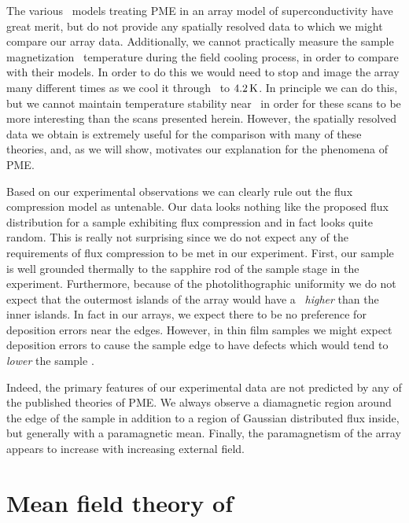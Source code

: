 The various \jjnoun\ models treating PME in an array model of 
superconductivity
have great merit, but do not provide any spatially resolved data
to which we might compare our array data. Additionally, we 
cannot practically measure the sample magnetization \vs\
temperature during the field cooling process, in order to 
compare with their models. In order to do this we would
need to stop and image the array many different times as we cool
it through \tc\ to $4.2\,\kelvin$. In principle we can do this, 
but we cannot maintain temperature stability near \tc\ in order 
for these scans to be more interesting than the scans presented
herein. However, the spatially resolved data we obtain is 
extremely useful for the comparison with many of these theories, 
and, as we will show, motivates our explanation for the 
phenomena of PME.

Based on our experimental observations we can clearly rule out
the flux compression model as untenable. Our data looks nothing
like the proposed flux distribution for a sample exhibiting
flux compression and in fact looks quite random. 
This is really not surprising since
we do not expect any of the 
requirements of flux compression to be met in our experiment. 
First, our sample is well grounded thermally to the sapphire rod of the
sample stage in the experiment. Furthermore, because of the
photolithographic uniformity
we do not expect that the outermost islands of the 
array would have a \tc\ \emph{higher} than the inner islands.
In fact in our arrays, we expect there to be no preference for
deposition errors near the edges. However, in thin film samples
we might expect  
deposition errors to cause the sample edge 
to have defects
which would tend to 
\emph{lower} the sample \tc. 

Indeed, the primary features of our experimental data are not
predicted by any of the published theories of PME. We always observe a
diamagnetic region around the edge of the sample in addition to 
a region of Gaussian distributed flux inside, but generally with
a  paramagnetic mean. Finally, the paramagnetism of the array appears to 
increase
with increasing external field. 

\section{Mean field theory of \jja}

